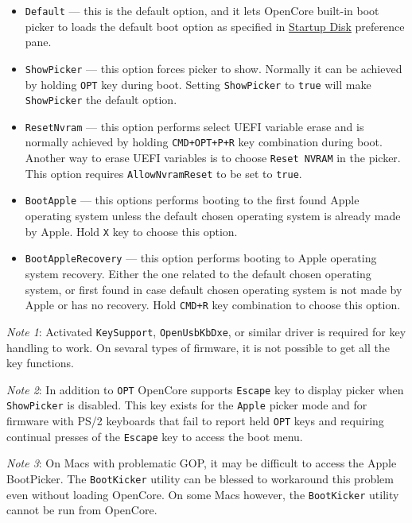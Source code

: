 \documentclass[]{article}
\providecommand{\tightlist}{%
  \setlength{\itemsep}{0pt}\setlength{\parskip}{0pt}}
\begin{document}
\begin{enumerate}
  \begin{itemize}
  \tightlist
  \item \texttt{Default} --- this is the default option, and it lets OpenCore built-in
  boot picker to loads the default boot option as specified in
  \href{https://support.apple.com/HT202796}{Startup Disk} preference pane.
  \item \texttt{ShowPicker} --- this option forces picker to show. Normally it can be
  achieved by holding \texttt{OPT} key during boot. Setting \texttt{ShowPicker} to
  \texttt{true} will make \texttt{ShowPicker} the default option.
  \item \texttt{ResetNvram} --- this option performs select UEFI variable erase and is
  normally achieved by holding \texttt{CMD+OPT+P+R} key combination during boot.
  Another way to erase UEFI variables is to choose \texttt{Reset NVRAM} in the picker.
  This option requires \texttt{AllowNvramReset} to be set to \texttt{true}.
  \item \texttt{BootApple} --- this options performs booting to the first found Apple
  operating system unless the default chosen operating system is already made by Apple.
  Hold \texttt{X} key to choose this option.
  \item \texttt{BootAppleRecovery} --- this option performs booting to Apple operating
  system recovery. Either the one related to the default chosen operating system,
  or first found in case default chosen operating system is not made by Apple or has no
  recovery. Hold \texttt{CMD+R} key combination to choose this option.
  \end{itemize}

  \emph{Note 1}: Activated \texttt{KeySupport}, \texttt{OpenUsbKbDxe}, or similar driver is required
  for key handling to work. On sevaral types of firmware, it is not possible to get all the key functions.

  \emph{Note 2}: In addition to \texttt{OPT} OpenCore supports \texttt{Escape} key to display picker when
  \texttt{ShowPicker} is disabled. This key exists for the \texttt{Apple} picker mode and for
  firmware with PS/2 keyboards that fail to report held \texttt{OPT} keys and requiring continual
  presses of the \texttt{Escape} key to access the boot menu.

  \emph{Note 3}: On Macs with problematic GOP, it may be difficult to access the Apple BootPicker.
  The \texttt{BootKicker} utility can be blessed to workaround this problem even without loading
  OpenCore. On some Macs however, the \texttt{BootKicker} utility cannot be run from OpenCore.

\end{enumerate}
\end{document}
